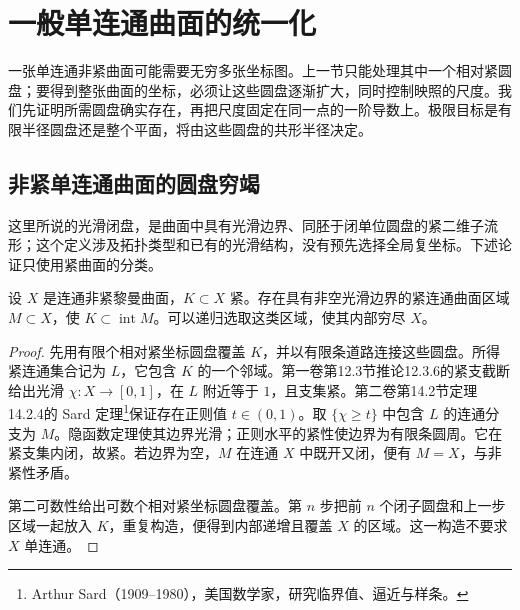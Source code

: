
% 
% 
% 
% 
% 
% 

\section{一般单连通曲面的统一化}
\label{g4:sec:0503}

一张单连通非紧曲面可能需要无穷多张坐标图。上一节只能处理其中一个相对紧圆盘；要得到整张曲面的坐标，必须让这些圆盘逐渐扩大，同时控制映照的尺度。我们先证明所需圆盘确实存在，再把尺度固定在同一点的一阶导数上。极限目标是有限半径圆盘还是整个平面，将由这些圆盘的共形半径决定。

\subsection{非紧单连通曲面的圆盘穷竭}
\label{g4:subsec:0503:01}

这里所说的光滑闭盘，是曲面中具有光滑边界、同胚于闭单位圆盘的紧二维子流形；这个定义涉及拓扑类型和已有的光滑结构，没有预先选择全局复坐标。下述论证只使用紧曲面的分类。

\begin{lemma}
	\label{g4:lem:0503:compact-neighborhood}
	设 \(X\) 是连通非紧黎曼曲面，\(K\subset X\) 紧。存在具有非空光滑边界的紧连通曲面区域 \(M\subset X\)，使 \(K\subset\operatorname{int}M\)。可以递归选取这类区域，使其内部穷尽 \(X\)。
\end{lemma}
\begin{proof}
	先用有限个相对紧坐标圆盘覆盖 \(K\)，并以有限条道路连接这些圆盘。所得紧连通集合记为 \(L\)，它包含 \(K\) 的一个邻域。第一卷第12.3节推论12.3.6的紧支截断给出光滑 \(\chi:X\to[0,1]\)，在 \(L\) 附近等于 \(1\)，且支集紧。第二卷第14.2节定理14.2.4的 Sard 定理\footnote{Arthur Sard（1909--1980），美国数学家，研究临界值、逼近与样条。}保证存在正则值 \(t\in(0,1)\)。取 \(\{\chi\ge t\}\) 中包含 \(L\) 的连通分支为 \(M\)。隐函数定理使其边界光滑；正则水平的紧性使边界为有限条圆周。它在紧支集内闭，故紧。若边界为空，\(M\) 在连通 \(X\) 中既开又闭，便有 \(M=X\)，与非紧性矛盾。

	第二可数性给出可数个相对紧坐标圆盘覆盖。第 \(n\) 步把前 \(n\) 个闭子圆盘和上一步区域一起放入 \(K\)，重复构造，便得到内部递增且覆盖 \(X\) 的区域。这一构造不要求 \(X\) 单连通。
\end{proof}

